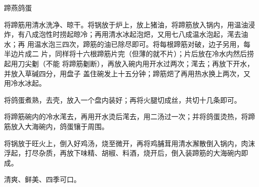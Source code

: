%
%
%
%
%
%
%
\begin{recipe}{蹄燕鸽蛋}

\ingredients


\preparation

\step 将蹄筋用清水洗净、晾干。将锅放于炉上，放上猪油，将蹄筋放入锅内，用温油浸
炸，有八成泡性时捞起晾冷；再用清水冰起泡𤆵，又用七八成温水泡起，滗去油水；再
用温水泡三四次，蹄筋的油已除尽即可。将每根蹄筋对破，边子另用，每半边片成二
片，同样将十六根蹄筋片完（但薄的就不片）；片后放在冷水内然后捞起用刀尖劖（不能
将蹄筋劖断），再放入碗内用开水过两次；滗去；再放下开水，并放入草碱四分，用盘子
盖住碗发上十五分钟；蹄筋𤆵了再用热水换上两次，又用冷水冰起。

\step 将鸽蛋煮熟，去壳，放入一个盘内装好；再将火腿切成丝，共切十几条即可。

\step 将蹄筋碗内的冷水滗去，再用开水烫后滗去，用二汤过一次；并将鸽蛋烫热，将蹄
筋放入大海碗内，鸽蛋镶于周围。

\step 将锅放于旺火上，倒入好鸡汤，烧至微开，再将鸡脯茸用清水澥散倒入锅内，肉沫
浮起，打尽杂质，再放下味精、胡椒、料酒，烧开后，倒入装蹄筋的大海碗内即成。

\features

清爽、鲜美、四季可口。

\end{recipe}


